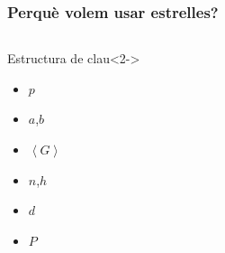\documentclass{beamer}
\newcommand{\EFp}{\ensuremath{E(\mathbb{F}_p)}}%
\theoremstyle{saltolinea}   			%
\begin{document}
\begin{frame}
  \frametitle{Perqu\`e volem usar estrelles?}
  \begin{columns}
      \begin{center}
        \begin{block}{Estructura de clau}<2->
           \begin{itemize}
             \item \alert<5>{$p$} \onslide<5>{$\rightarrow$ \EFp}
             \item \alert<6>{$a$,$b$} 
             \item \alert<4>{$\left< G \right>$} 
             \item $n$,$h$
             \item \alert<3>{$d$}
             \item \alert<3>{$P$} 
           \end{itemize}
        \end{block}
      \end{center}
  \end{columns}
\end{frame}
\end{document}
